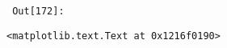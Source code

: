 \documentclass{article}
\newlength{\inputpadding}
\newlength{\cellleftmargin}
\newlength{\smallerfontscale}
\def\smaller{\fontsize{\smallerfontscale}{\smallerfontscale}\selectfont}
\begin{document}
        {\par%
        \vspace{-1\smallerfontscale}%
        \noindent%
        \begin{minipage}{\cellleftmargin}%
    \hfill%
    {\smaller%
    \tt%
    \color{nbframe-out-prompt}%
    Out[172]:}%
    \hspace{\inputpadding}%
    \hspace{0em}%
    \hspace{3pt}%
    \end{minipage}%
        }%
    \begin{addmargin}[\cellleftmargin]{0em}%
    {\smaller%
    \vspace{-1\smallerfontscale}%
    
    
    
    \begin{verbatim}
<matplotlib.text.Text at 0x1216f0190>
    \end{verbatim}

    
}%
    \end{addmargin}%
    \begin{addmargin}[\cellleftmargin]{0em}%
    {\smaller%
    \vspace{-1\smallerfontscale}%
    
    \begin{center}
    \end{center}
    { \hspace*{\fill} \\}
    }%
    \end{addmargin}%
    \begin{addmargin}[\cellleftmargin]{0em}%
    {\smaller%
    \vspace{-1\smallerfontscale}%
    
    \begin{center}
    \end{center}
    { \hspace*{\fill} \\}
    }%
    \end{addmargin}%
\end{document}
